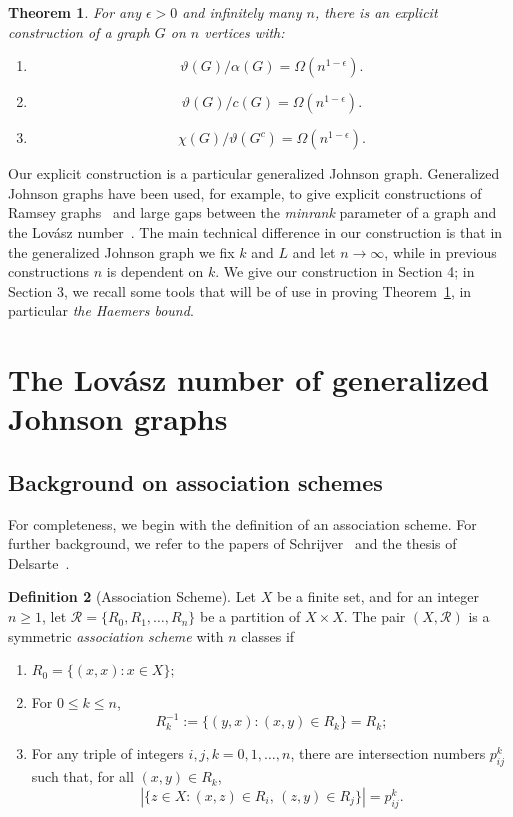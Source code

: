 \documentclass[11pt]{article}
\newtheorem{theorem}{Theorem}[section]
\theoremstyle{definition}
\newtheorem{definition}[theorem]{Definition}
\theoremstyle{remark}
\begin{document}
\begin{theorem}\label{thm:lovaszthetaeps}
For any $\epsilon > 0$ and infinitely many $n$, there is an explicit construction of a graph $G$ on $n$ vertices with:
\begin{enumerate}
\item \[\vartheta(G)/\alpha(G) = \Omega(n^{1 - \epsilon}).\]
\item \[\vartheta(G)/c(G) = \Omega(n^{1-\epsilon}).\]
\item \[\chi(G)/\vartheta(G^c) = \Omega(n^{1-\epsilon}).\] 
\end{enumerate}
\end{theorem}

Our explicit construction is a particular generalized Johnson graph. Generalized Johnson graphs have been used, for example, to give explicit constructions of Ramsey graphs~\cite{FW1981} and large gaps between the \textit{minrank} parameter of a graph and the Lov\'asz number~\cite{Haviv, LubStav}. The main technical difference in our construction is that in the generalized Johnson graph we fix $k$ and $L$ and let $n\rightarrow \infty$, while in previous constructions $n$ is dependent on $k$. We give our construction in Section 4; in Section 3, we recall some tools that will be of use in proving Theorem~\ref{thm:lovaszthetaeps}, in particular \emph{the Haemers bound}. 

\section{The Lov\'asz number of generalized Johnson graphs}

\subsection{Background on association schemes}

For completeness, we begin with the definition of an association scheme. For further background, we refer to the papers of Schrijver~\cite{Sch1978, Sch1979} and the thesis of Delsarte~\cite{Del1973}.

\begin{definition}[Association Scheme]\label{defn:assoscheme}
Let $X$ be a finite set, and for an integer $n \ge 1$, let $\mathcal{R} = \{R_0, R_1, \ldots, R_n\}$ be a partition of $X\times{X}$. The pair $(X, \mathcal{R})$ is a symmetric \emph{association scheme} with $n$ classes if 
\begin{enumerate}
\item $R_0 = \{(x, x): x\in X\};$
\item For $0\le k\le n$, \[R_k^{-1}:= \{(y, x): (x, y) \in R_k\} = R_k;\]
\item For any triple of integers $i, j, k = 0, 1, \ldots, n$, there are intersection numbers $p_{ij}^k$ such that, for all $(x, y) \in R_k$, \[|\{z\in X: (x, z)\in R_i,\, (z, y)\in R_j\}| = p_{ij}^k.\]
\end{enumerate}
\end{definition}
\end{document}
